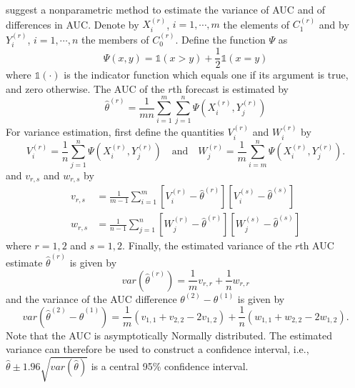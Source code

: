 \documentclass[article]{jss}\usepackage{graphicx, color}
\begin{document}
\citet{delong1988comparing} suggest a nonparametric method to estimate the variance of AUC and of differences in AUC.
Denote by $X^{(r)}_i$, $i=1,\cdots,m$ the elements of $C^{(r)}_1$ and by $Y^{(r)}_i$, $i=1,\cdots,n$ the members of $C^{(r)}_0$.
Define the function $\Psi$ as
%
\begin{equation}
\Psi(x,y) = \mathds{1}(x>y) + \frac{1}{2} \mathds{1}(x=y)
\end{equation}
%
where $\mathds{1}(\cdot)$ is the indicator function which equals one if its argument is true, and zero otherwise.
The AUC of the $r$th forecast is estimated by 
%
\begin{equation}
\hat\theta^{(r)} = \frac{1}{mn} \sum_{i=1}^m \sum_{j=1}^n \Psi(X^{(r)}_i, Y^{(r)}_j)
\end{equation}
%
For variance estimation, first define the quantities $V_i^{(r)}$ and $W_i^{(r)}$ by
%
\begin{equation}
V_i^{(r)} = \frac1n \sum_{j=1}^n \Psi(X^{(r)}_i, Y^{(r)}_j)\quad\text{and}\quad W_j^{(r)} = \frac1m \sum_{i=m}^n \Psi(X^{(r)}_i, Y^{(r)}_j).
\end{equation}
%
and $v_{r,s}$ and $w_{r,s}$ by
%
\begin{align}
v_{r,s} & = \frac{1}{m-1} \sum_{i=1}^m [V_i^{(r)} - \hat\theta^{(r)}][V_i^{(s)} - \hat\theta^{(s)}]\\
w_{r,s} & = \frac{1}{n-1} \sum_{j=1}^n [W_j^{(r)} - \hat\theta^{(r)}][W_j^{(s)} - \hat\theta^{(s)}]
\end{align}
%
where $r=1,2$ and $s=1,2$.
Finally, the estimated variance of the $r$th AUC estimate $\hat\theta^{(r)}$ is given by
%
\begin{equation}
var(\hat\theta^{(r)}) = \frac{1}{m} v_{r,r} + \frac{1}{n} w_{r,r}
\end{equation}
%
and the variance of the AUC difference $\theta^{(2)} - \theta^{(1)}$ is given by
%
\begin{equation}
var(\hat\theta^{(2)} - \hat\theta^{(1)}) = \frac{1}{m} (v_{1,1} + v_{2,2} - 2 v_{1,2}) + \frac{1}{n} (w_{1,1} + w_{2,2} - 2 w_{1,2}).
\end{equation}
%
Note that the AUC is asymptotically Normally distributed.
The estimated variance can therefore be used to construct a confidence interval, i.e., $\hat\theta \pm 1.96 \sqrt{var(\hat\theta)}$ is a central 95\% confidence interval.
\end{document}

